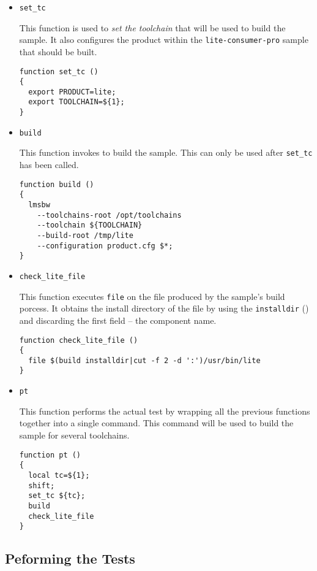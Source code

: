 \begin{itemize}
  \item{\texttt{set\_tc}}

    This function is used to \emph{set the toolchain} that will be
    used to build the sample.  It also configures the product within
    the \texttt{lite-consumer-pro} sample that should be built.

\begin{verbatim}
function set_tc ()
{
  export PRODUCT=lite;
  export TOOLCHAIN=${1};
}
\end{verbatim}

\item{\texttt{build}}

  This function invokes \lmsbw to build the sample.  This can only be
  used after \texttt{set\_tc} has been called.

\begin{verbatim}
function build ()
{
  lmsbw
    --toolchains-root /opt/toolchains
    --toolchain ${TOOLCHAIN}
    --build-root /tmp/lite
    --configuration product.cfg $*;
}
\end{verbatim}

\item{\texttt{check\_lite\_file}}

  This function executes \texttt{file} on the file produced by the
  sample's build porcess.  It obtains the install directory of the
  file by using the \texttt{installdir} ()
  and discarding the first field -- the component name.

\begin{small}
\begin{verbatim}
function check_lite_file ()
{
  file $(build installdir|cut -f 2 -d ':')/usr/bin/lite
}
\end{verbatim}
\end{small}

\item{\texttt{pt}}

  This function performs the actual test by wrapping all the previous
  functions together into a single command.  This command will be used
  to build the sample for several toolchains.

\begin{verbatim}
function pt ()
{
  local tc=${1};
  shift;
  set_tc ${tc};
  build
  check_lite_file
}
\end{verbatim}
\end{itemize}

\subsection{Peforming the Tests}

